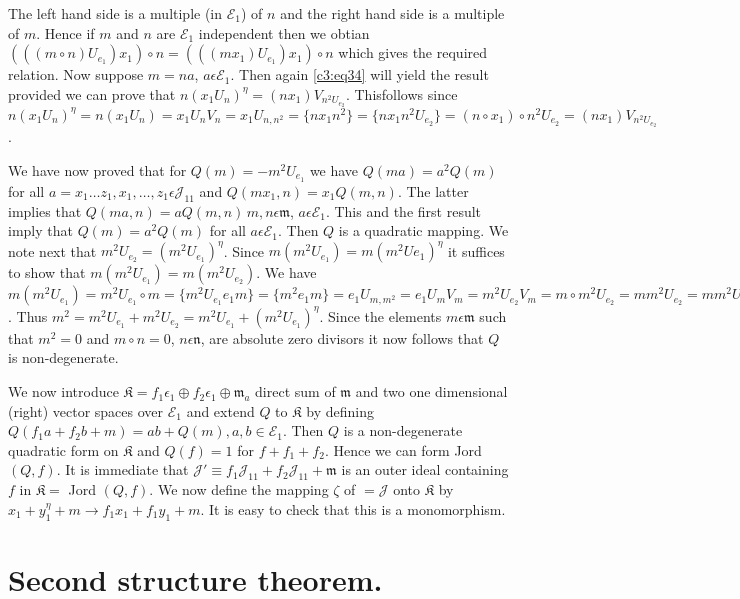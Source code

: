 The left hand side is a multiple (in $\mathcal{E}_1$) of $n$ and the
right hand side is a multiple of $m$. Hence if $m$ and $n$ are
$\mathcal{E}_1$ independent then we obtian $(((m\circ
n)U_{e_1})x_1)\circ n=(((mx_1)U_{e_1})x_1)\circ n$ which gives the
required relation. Now suppose $m=na$, $a\epsilon \mathcal{E}_1$. Then
again \eqref{c3:eq34} will yield the result provided we can prove that
$n(x_1U_n)^{\eta}=(nx_1)V_{n^{2}U_{e_2}}$. This\pageoriginale follows
since
$n(x_1U_n)^{\eta}=n(x_1U_n)=x_1U_nV_n=x_1U_{n,n^{2}}=\{nx_1n^{2}\}=\{n
x_1n^{2}U_{e_2}\}=(n\circ x_1)\circ n^{2}
U_{e_2}=(nx_1)V_{n^{2}U_{e_2}}$. 

We have now proved that for $Q(m)=-m^{2}U_{e_1}$ we have
$Q(ma)=a^{2}Q(m)$ for all $a=x_1\ldots z_1,x_1,\ldots,z_1\epsilon
\mathscr{J}_{11}$ and $Q(mx_1, n)=x_1Q(m,n)$. The latter implies that
$Q(ma,n)=aQ(m,n)\, m,n\epsilon \mathfrak{m}$, $a\epsilon
\mathcal{E}_1$. This and the first result imply that $Q(m)=a^{2}Q(m)$
for all $a\epsilon \mathcal{E}_1$. Then $Q$ is a quadratic mapping. We
note next that $m^{2}U_{e_2}=(m^{2}U_{e_1})^{\eta}$. Since
$m(m^{2}U_{e_1})=m(m^{2}U{e_1})^{\eta}$ it suffices to show that
$m(m^{2}U_{e_1})=m(m^{2}U_{e_2})$. We have
$m(m^{2}U_{e_1})=m^{2}U_{e_1}\circ m
=\{m^{2}U_{e_1}e_1m\}=\{m^{2}e_1m\}=e_1U_{m,m^{2}}=e_1U_mV_m=m^{2}U_{e_2}V_m=m\circ
m^{2}U_{e_2}=mm^{2}U_{e_2}=mm^{2}U_{e_2}$. Thus
$m^{2}=m^{2}U_{e_1}+m^{2}U_{e_2}=m^{2}U_{e_1}+(m^{2}U_{e_1})^{\eta}$. Since
the elements $m\epsilon \mathfrak{m}$ such that $m^{2}=0$ and $m\circ
n=0$, $n\epsilon \mathfrak{n}$, are absolute zero divisors it now
follows that $Q$ is non-degenerate.

We now introduce $\mathfrak{K}=f_1\epsilon_1\oplus f_2\epsilon_1 \oplus
\mathfrak{m}_a$ direct sum of $\mathfrak{m}$ and two one dimensional
(right) vector spaces over $\mathcal{E}_1$ and extend $Q$ to
$\mathfrak{K}$ by defining $Q(f_1a+f_2b+m)=ab+Q(m),a,b\in
\mathcal{E}_1$. Then $Q$ is a non-degenerate quadratic form on
$\mathfrak{K}$ and $Q(f)=1$ for $f+f_1+f_2$. Hence we can form Jord
$(Q,f)$. It is immediate that $\mathscr{J}'\equiv
f_1\mathscr{J}_{11}+f_2\mathscr{J}_{11}+\mathfrak{m}$ is an outer
ideal containing $f$ in $\mathfrak{K}=$ Jord $(Q,f)$. We now define the
mapping $\zeta$ of $=\mathscr{J}$ onto $\mathfrak{K}$ by
$x_1+y_1^{\eta}+m\to f_1 x_1+f_1y_1+m$. It is easy to check that this
is a monomorphism.

\section{Second structure theorem.}\label{c3:sec10}

